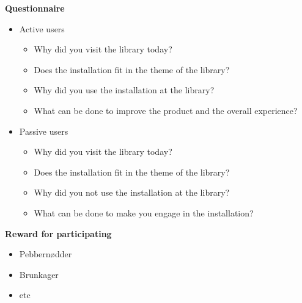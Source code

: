 \textbf{Questionnaire}
\begin{itemize}
\item Active users
\begin{itemize}
\item Why did you visit the library today?
\item Does the installation fit in the theme of the library?
\item Why did you use the installation at the library?
\item What can be done to improve the product and the overall experience?
\end{itemize}
\item Passive users
\begin{itemize}
\item Why did you visit the library today?
\item Does the installation fit in the theme of the library?
\item Why did you not use the installation at the library?
\item What can be done to make you engage in the installation?
\end{itemize}
\end{itemize}
\textbf{Reward for participating}
\begin{itemize}
\item Pebbern{\o}dder
\item Brunkager
\item etc
\end{itemize}
